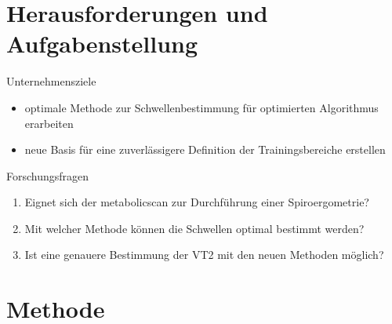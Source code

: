 \documentclass[colorBG,slideColor,8pt]{beamer}
\newcommand{\vcotwo}{\.{V}CO\textsubscript{2}}
\newcommand{\ve}{\.{V}E}
\begin{document}
\begin{frame}
\begin{columns}
\begin{column}{\linewidth}
\begin{figure}[H]
\begin{subfigure}[c]{0.2\linewidth}
		\subcaption{\ve/\vcotwo}
	\end{subfigure}
\end{figure}
\end{column}
\end{columns}
\end{frame}


\section{Herausforderungen und Aufgabenstellung}

\begin{frame}
\begin{block}{Unternehmensziele}
	\begin{itemize}
		\item optimale Methode zur Schwellenbestimmung für optimierten Algorithmus erarbeiten
		\item neue Basis für eine zuverlässigere Definition der Trainingsbereiche erstellen
	\end{itemize}
\end{block}
\begin{block}{Forschungsfragen}
	\begin{enumerate}
		\item Eignet sich der metabolicscan zur Durchführung einer Spiroergometrie?
		\item Mit welcher Methode können die Schwellen optimal bestimmt werden?
		\item Ist eine genauere Bestimmung der VT2 mit den neuen Methoden möglich?
	\end{enumerate}
\end{block}
\end{frame}

\section{Methode}
\end{document}
